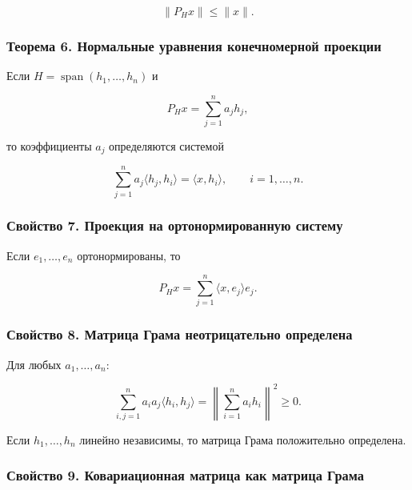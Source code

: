 \documentclass[
  11pt,
  a4paper,
]{article}
\begin{document}
\[
\|P_Hx\|\le\|x\|.
\]

\subsubsection{Теорема 6. Нормальные уравнения конечномерной
проекции}\label{ux442ux435ux43eux440ux435ux43cux430-6.-ux43dux43eux440ux43cux430ux43bux44cux43dux44bux435-ux443ux440ux430ux432ux43dux435ux43dux438ux44f-ux43aux43eux43dux435ux447ux43dux43eux43cux435ux440ux43dux43eux439-ux43fux440ux43eux435ux43aux446ux438ux438}

Если \(H=\operatorname{span}(h_1,\ldots,h_n)\) и

\[
P_Hx=\sum_{j=1}^n a_jh_j,
\]

то коэффициенты \(a_j\) определяются системой

\[
\sum_{j=1}^n a_j\langle h_j,h_i\rangle
=
\langle x,h_i\rangle,
\qquad i=1,\ldots,n.
\]

\subsubsection{Свойство 7. Проекция на ортонормированную
систему}\label{ux441ux432ux43eux439ux441ux442ux432ux43e-7.-ux43fux440ux43eux435ux43aux446ux438ux44f-ux43dux430-ux43eux440ux442ux43eux43dux43eux440ux43cux438ux440ux43eux432ux430ux43dux43dux443ux44e-ux441ux438ux441ux442ux435ux43cux443}

Если \(e_1,\ldots,e_n\) ортонормированы, то

\[
P_Hx=\sum_{j=1}^n\langle x,e_j\rangle e_j.
\]

\subsubsection{Свойство 8. Матрица Грама неотрицательно
определена}\label{ux441ux432ux43eux439ux441ux442ux432ux43e-8.-ux43cux430ux442ux440ux438ux446ux430-ux433ux440ux430ux43cux430-ux43dux435ux43eux442ux440ux438ux446ux430ux442ux435ux43bux44cux43dux43e-ux43eux43fux440ux435ux434ux435ux43bux435ux43dux430}

Для любых \(a_1,\ldots,a_n\):

\[
\sum_{i,j=1}^n a_i a_j\langle h_i,h_j\rangle
=
\left\|\sum_{i=1}^n a_ih_i\right\|^2
\ge0.
\]

Если \(h_1,\ldots,h_n\) линейно независимы, то матрица Грама
положительно определена.

\subsubsection{Свойство 9. Ковариационная матрица как матрица
Грама}\label{ux441ux432ux43eux439ux441ux442ux432ux43e-9.-ux43aux43eux432ux430ux440ux438ux430ux446ux438ux43eux43dux43dux430ux44f-ux43cux430ux442ux440ux438ux446ux430-ux43aux430ux43a-ux43cux430ux442ux440ux438ux446ux430-ux433ux440ux430ux43cux430}
\end{document}
